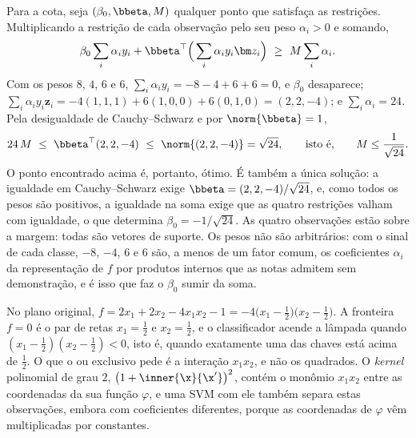 \begin{solucao}
Para a cota, seja $(\beta_0,\bbeta,M)$ qualquer ponto que satisfaça as restrições.
Multiplicando a restrição de cada observação pelo seu peso $\alpha_i>0$ e somando,
\[
  \beta_0\sum_i\alpha_iy_i+\bbeta^\top\Big(\sum_i\alpha_iy_i\bm z_i\Big)\ \ge\ M\sum_i\alpha_i .
\]
Com os pesos $8$, $4$, $6$ e $6$, $\sum_i\alpha_iy_i=-8-4+6+6=0$, e $\beta_0$ desaparece;
$\sum_i\alpha_iy_i\bm z_i=-4(1,1,1)+6(1,0,0)+6(0,1,0)=(2,2,-4)$; e $\sum_i\alpha_i=24$. Pela
desigualdade de Cauchy--Schwarz e por $\norm{\bbeta}=1$,
\[
  24\,M\ \le\ \bbeta^\top(2,2,-4)\ \le\ \norm{(2,2,-4)}=\sqrt{24},
  \qquad\text{isto é,}\qquad M\le\frac1{\sqrt{24}} .
\]
O ponto encontrado acima é, portanto, ótimo. É também a única solução: a igualdade em
Cauchy--Schwarz exige $\bbeta=(2,2,-4)/\sqrt{24}$, e, como todos os pesos são positivos, a
igualdade na soma exige que as quatro restrições valham com igualdade, o que determina
$\beta_0=-1/\sqrt{24}$. As quatro observações estão sobre a margem: todas são vetores de
suporte. Os pesos não são arbitrários: com o sinal de cada classe, $-8$, $-4$, $6$ e $6$ são,
a menos de um fator comum, os coeficientes $\alpha_i$ da representação de $f$ por produtos
internos que as notas admitem sem demonstração, e é isso que faz o $\beta_0$ sumir da soma.

No plano original, $f=2x_1+2x_2-4x_1x_2-1=-4\big(x_1-\tfrac12\big)\big(x_2-\tfrac12\big)$. A
fronteira $f=0$ é o par de retas $x_1=\tfrac12$ e $x_2=\tfrac12$, e o classificador acende a
lâmpada quando $(x_1-\tfrac12)(x_2-\tfrac12)<0$, isto é, quando exatamente uma das chaves está
acima de $\tfrac12$. O que o ou exclusivo pede é a interação $x_1x_2$, e não os quadrados. O
\emph{kernel} polinomial de grau $2$, $\big(1+\inner{\x}{\x'}\big)^2$, contém o monômio $x_1x_2$
entre as coordenadas da sua função $\varphi$, e uma SVM com ele também separa estas
observações, embora com coeficientes diferentes, porque as coordenadas de $\varphi$ vêm
multiplicadas por constantes.
\end{solucao}
